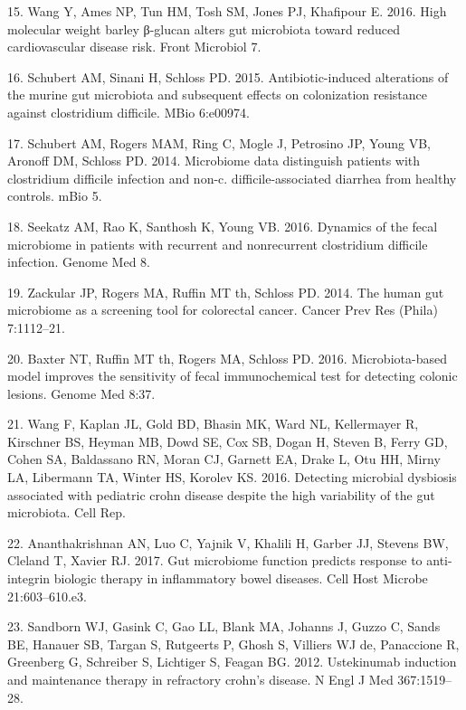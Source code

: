 \documentclass[11pt,]{article}
\begin{document}
\hypertarget{ref-Wang_cvdrisk_2016}{}
15. Wang Y, Ames NP, Tun HM, Tosh SM, Jones PJ, Khafipour E. 2016. High
molecular weight barley β-glucan alters gut microbiota toward reduced
cardiovascular disease risk. Front Microbiol 7.

\hypertarget{ref-Schubert_cdiff_2016}{}
16. Schubert AM, Sinani H, Schloss PD. 2015. Antibiotic-induced
alterations of the murine gut microbiota and subsequent effects on
colonization resistance against clostridium difficile. MBio 6:e00974.

\hypertarget{ref-Schubert_cdiff_2014}{}
17. Schubert AM, Rogers MAM, Ring C, Mogle J, Petrosino JP, Young VB,
Aronoff DM, Schloss PD. 2014. Microbiome data distinguish patients with
clostridium difficile infection and non-c. difficile-associated diarrhea
from healthy controls. mBio 5.

\hypertarget{ref-Seekatz_cdiff_2016}{}
18. Seekatz AM, Rao K, Santhosh K, Young VB. 2016. Dynamics of the fecal
microbiome in patients with recurrent and nonrecurrent clostridium
difficile infection. Genome Med 8.

\hypertarget{ref-zackular_CRC_2014}{}
19. Zackular JP, Rogers MA, Ruffin MT th, Schloss PD. 2014. The human
gut microbiome as a screening tool for colorectal cancer. Cancer Prev
Res (Phila) 7:1112--21.

\hypertarget{ref-baxter_FIT_2016}{}
20. Baxter NT, Ruffin MT th, Rogers MA, Schloss PD. 2016.
Microbiota-based model improves the sensitivity of fecal immunochemical
test for detecting colonic lesions. Genome Med 8:37.

\hypertarget{ref-wang_pedsCD_2016}{}
21. Wang F, Kaplan JL, Gold BD, Bhasin MK, Ward NL, Kellermayer R,
Kirschner BS, Heyman MB, Dowd SE, Cox SB, Dogan H, Steven B, Ferry GD,
Cohen SA, Baldassano RN, Moran CJ, Garnett EA, Drake L, Otu HH, Mirny
LA, Libermann TA, Winter HS, Korolev KS. 2016. Detecting microbial
dysbiosis associated with pediatric crohn disease despite the high
variability of the gut microbiota. Cell Rep.

\hypertarget{ref-Ananthakrishnan_IBD_2017}{}
22. Ananthakrishnan AN, Luo C, Yajnik V, Khalili H, Garber JJ, Stevens
BW, Cleland T, Xavier RJ. 2017. Gut microbiome function predicts
response to anti-integrin biologic therapy in inflammatory bowel
diseases. Cell Host Microbe 21:603--610.e3.

\hypertarget{ref-sandborn_ust_2012}{}
23. Sandborn WJ, Gasink C, Gao LL, Blank MA, Johanns J, Guzzo C, Sands
BE, Hanauer SB, Targan S, Rutgeerts P, Ghosh S, Villiers WJ de,
Panaccione R, Greenberg G, Schreiber S, Lichtiger S, Feagan BG. 2012.
Ustekinumab induction and maintenance therapy in refractory crohn's
disease. N Engl J Med 367:1519--28.
\end{document}
